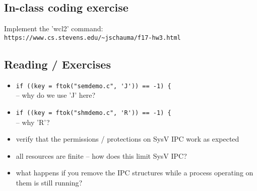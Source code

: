 \documentclass[xga]{xdvislides}
\begin{document}
\subsection{In-class coding exercise}
Implement the 'wcl2' command: \\

\vspace{1in}
\verb+https://www.cs.stevens.edu/~jschauma/f17-hw3.html+

\subsection{Reading / Exercises}
\begin{itemize}
	\item \verb+if ((key = ftok("semdemo.c", 'J')) == -1) {+ \\
		-- why do we use 'J' here?
	\item \verb+if ((key = ftok("shmdemo.c", 'R')) == -1) {+ \\
		-- why 'R'?
	\item verify that the permissions / protections on SysV IPC work as expected
	\item all resources are finite -- how does this limit SysV IPC?
	\item what happens if you remove the IPC structures while a process operating on them is still running?
\end{itemize}
\end{document}
